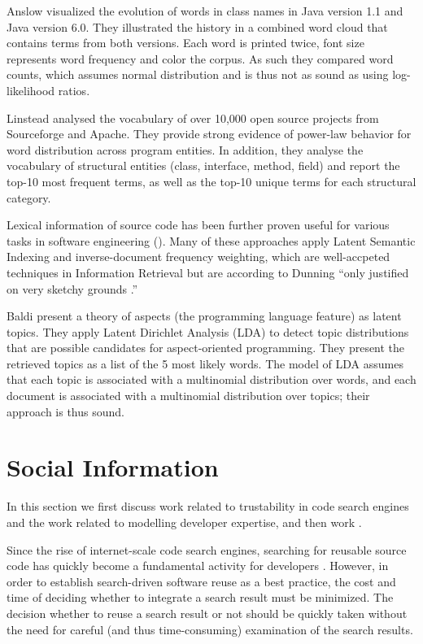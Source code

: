 Anslow \etal \cite{Anslow08OOPSLA} visualized the evolution of words in class names in Java version 1.1 and Java version 6.0. They illustrated the history in a combined word cloud that contains terms from both versions. Each word is printed twice, font size represents word frequency and color the corpus. As such they compared word counts, which assumes normal distribution and is thus not as sound as using log-likelihood ratios.
 
Linstead \etal \cite{Linstead09SUITE} analysed the vocabulary of over 10,000 open source projects from Sourceforge and Apache. They provide strong evidence of power-law behavior for word distribution across program entities. In addition, they analyse the vocabulary of structural entities (class, interface, method, field) and report the top-10 most frequent terms, as well as the top-10 unique terms for each structural category.

Lexical information of source code has been further proven useful for various tasks in software engineering (\eg \cite{Anto02a,Marc05a,Posh09a}). Many of these approaches apply Latent Semantic Indexing and inverse-document frequency weighting, which are well-accpeted techniques in Information Retrieval but are according to Dunning ``only justified on very sketchy grounds \cite{Dunning}.''

Baldi \etal \cite{Bald08a} present a theory of aspects (the programming language feature) as latent topics. They apply Latent Dirichlet Analysis (LDA) to detect topic distributions that are possible candidates for aspect-oriented programming. They present the retrieved topics as a list of the 5 most likely words. The model of LDA assumes that each topic is associated with a multinomial distribution over words, and each document is associated with a multinomial distribution over topics; their approach is thus sound.


\section{Social Information}

In this section we first discuss work related to trustability in code search engines and the work related to modelling developer expertise, and then work .

Since the rise of internet-scale code search engines, searching for reusable source code has quickly become a fundamental activity for developers \cite{Kuhn09b}. However, in order to establish search-driven software reuse as a best practice, the cost and time of deciding whether to integrate a search result must be minimized. The decision whether to reuse a search result or not should be quickly taken without the need for careful (and thus time-consuming) examination of the search results.

